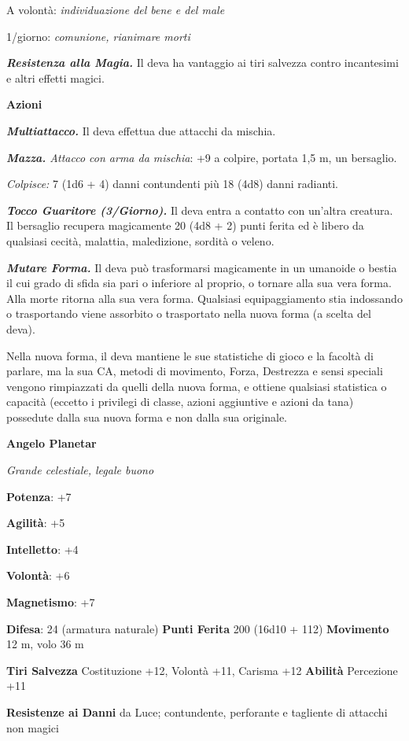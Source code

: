 \begin{multicols}{2}
A volontà: \emph{individuazione del bene e del male}

1/giorno: \emph{comunione, rianimare morti}

\emph{\textbf{Resistenza alla Magia.}} Il deva ha vantaggio ai tiri
salvezza contro incantesimi e altri effetti magici.

\textbf{Azioni}

\emph{\textbf{Multiattacco.}} Il deva effettua due attacchi da mischia.

\emph{\textbf{Mazza.} Attacco con arma da mischia}: +9 a colpire,
portata 1,5 m, un bersaglio.

\emph{Colpisce:} 7 (1d6 + 4) danni contundenti più 18 (4d8) danni
radianti.

\emph{\textbf{Tocco Guaritore (3/Giorno).}} Il deva entra a contatto con
un'altra creatura. Il bersaglio recupera magicamente 20 (4d8 + 2) punti
ferita ed è libero da qualsiasi cecità, malattia, maledizione, sordità o
veleno.

\emph{\textbf{Mutare Forma.}} Il deva può trasformarsi magicamente in un
umanoide o bestia il cui grado di sfida sia pari o inferiore al proprio,
o tornare alla sua vera forma. Alla morte ritorna alla sua vera forma.
Qualsiasi equipaggiamento stia indossando o trasportando viene assorbito
o trasportato nella nuova forma (a scelta del deva).

Nella nuova forma, il deva mantiene le sue statistiche di gioco e la
facoltà di parlare, ma la sua CA, metodi di movimento, Forza, Destrezza
e sensi speciali vengono rimpiazzati da quelli della nuova forma, e
ottiene qualsiasi statistica o capacità (eccetto i privilegi di classe,
azioni aggiuntive e azioni da tana) possedute dalla sua nuova forma e
non dalla sua originale.

\textbf{Angelo Planetar}

\emph{Grande celestiale, legale buono}

\textbf{Potenza}: +7

\textbf{Agilità}: +5

\textbf{Intelletto}: +4

\textbf{Volontà}: +6

\textbf{Magnetismo}: +7

\textbf{Difesa}: 24 (armatura naturale) \textbf{Punti Ferita}
200 (16d10 + 112) \textbf{Movimento} 12 m, volo 36 m

\textbf{Tiri Salvezza} Costituzione +12, Volontà +11, Carisma +12
\textbf{Abilità} Percezione +11

\textbf{Resistenze ai Danni} da Luce; contundente, perforante e
tagliente di attacchi non magici


\end{multicols}
